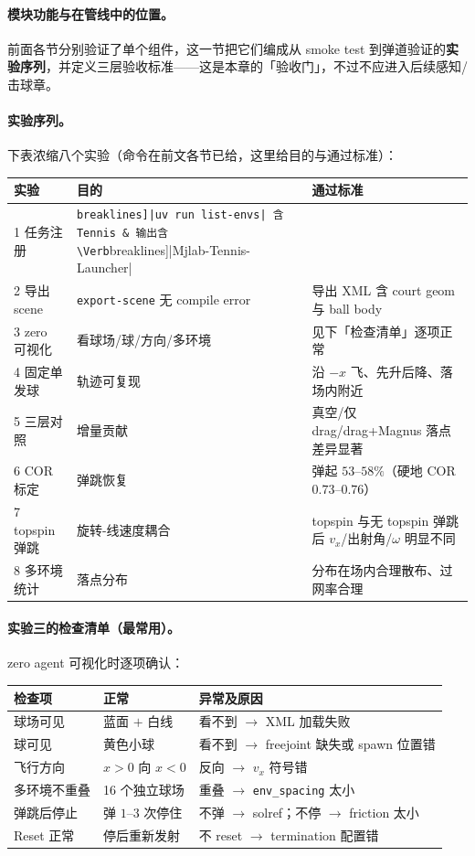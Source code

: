 \paragraph{模块功能与在管线中的位置。}前面各节分别验证了单个组件，这一节把它们编成从 smoke test 到弹道验证的\textbf{实验序列}，并定义三层验收标准——这是本章的「验收门」，不过不应进入后续感知/击球章。

\paragraph{实验序列。}下表浓缩八个实验（命令在前文各节已给，这里给目的与通过标准）：

\begin{center}
\small
\begin{tabular}{@{}llp{6.0cm}@{}}
\toprule
实验 & 目的 & 通过标准 \\
\midrule
1 任务注册 & \Verb[breaklines]|uv run list-envs| 含 Tennis & 输出含 \Verb[breaklines]|Mjlab-Tennis-Launcher| \\
2 导出 scene & \verb|export-scene| 无 compile error & 导出 XML 含 court geom 与 ball body \\
3 zero 可视化 & 看球场/球/方向/多环境 & 见下「检查清单」逐项正常 \\
4 固定单发球 & 轨迹可复现 & 沿 $-x$ 飞、先升后降、落场内附近 \\
5 三层对照 & 增量贡献 & 真空/仅 drag/drag+Magnus 落点差异显著 \\
6 COR 标定 & 弹跳恢复 & 弹起 $53$--$58\%$（硬地 COR $0.73$--$0.76$） \\
7 topspin 弹跳 & 旋转-线速度耦合 & topspin 与无 topspin 弹跳后 $v_x$/出射角/$\omega$ 明显不同 \\
8 多环境统计 & 落点分布 & 分布在场内合理散布、过网率合理 \\
\bottomrule
\end{tabular}
\end{center}

\paragraph{实验三的检查清单（最常用）。}zero agent 可视化时逐项确认：

\begin{center}
\small
\begin{tabular}{@{}lll@{}}
\toprule
检查项 & 正常 & 异常及原因 \\
\midrule
球场可见 & 蓝面 $+$ 白线 & 看不到 $\to$ XML 加载失败 \\
球可见 & 黄色小球 & 看不到 $\to$ freejoint 缺失或 spawn 位置错 \\
飞行方向 & $x>0$ 向 $x<0$ & 反向 $\to$ $v_x$ 符号错 \\
多环境不重叠 & 16 个独立球场 & 重叠 $\to$ \verb|env_spacing| 太小 \\
弹跳后停止 & 弹 $1$--$3$ 次停住 & 不弹 $\to$ solref；不停 $\to$ friction 太小 \\
Reset 正常 & 停后重新发射 & 不 reset $\to$ termination 配置错 \\
\bottomrule
\end{tabular}
\end{center}

